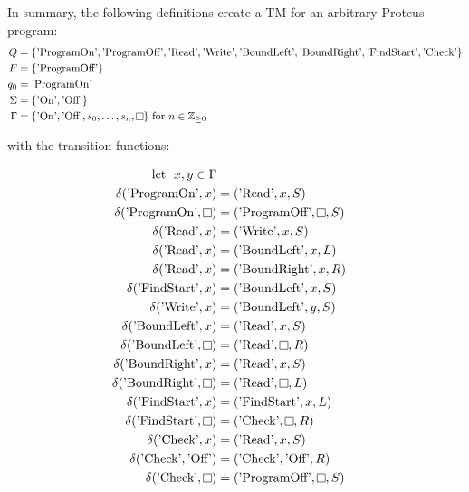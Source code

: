 \newpage

In summary, the following definitions create a TM for an arbitrary Proteus program:
\[
    \begin{aligned}
        Q &= \{\text{'ProgramOn'}, \text{'ProgramOff'}, \text{'Read'}, \text{'Write'}, \text{'BoundLeft'}, \text{'BoundRight'}, \text{'FindStart'}, \text{'Check'}\}\\
        F &= \{\text{'ProgramOff'}\}\\
        q_{0} &= \text{'ProgramOn'}\\
        \Sigma &= \{\text{'On'}, \text{'Off'}\}\\
        \Gamma &= \{\text{'On'}, \text{'Off'}, s_{0}, \dots, s_{n}, \raisebox{0.1cm}{\fbox{}}\} \text{ for } n \in \mathbb{Z}_{\geq \text{0}}
    \end{aligned}
\]

with the transition functions:


\[
    \begin{aligned}
        \text{let \hspace{0.1cm}} x, y \in \Gamma\\
        \delta (\text{'ProgramOn'}, x) &= (\text{'Read'}, x, S)\\
        \delta (\text{'ProgramOn'}, \raisebox{0.1cm}{\fbox{}}) &= (\text{'ProgramOff'}, \raisebox{0.1cm}{\fbox{}}, S)\\
%
        \delta (\text{'Read'}, x) &= (\text{'Write'}, x, S)\\
        \delta (\text{'Read'}, x) &= (\text{'BoundLeft'}, x, L)\\
        \delta (\text{'Read'}, x) &= (\text{'BoundRight'}, x, R)\\
        \delta (\text{'FindStart'}, x) &= (\text{'BoundLeft'}, x, S)\\
%
        \delta (\text{'Write'}, x) &= (\text{'BoundLeft'}, y, S)\\
%
        \delta (\text{'BoundLeft'}, x) &= (\text{'Read'}, x, S)\\
        \delta (\text{'BoundLeft'}, \raisebox{0.1cm}{\fbox{}}) &= (\text{'Read'}, \raisebox{0.1cm}{\fbox{}}, R)\\
%
        \delta (\text{'BoundRight'}, x) &= (\text{'Read'}, x, S)\\
        \delta (\text{'BoundRight'}, \raisebox{0.1cm}{\fbox{}}) &= (\text{'Read'}, \raisebox{0.1cm}{\fbox{}}, L)\\
%
        \delta (\text{'FindStart'}, x) &= (\text{'FindStart'}, x, L)\\
        \delta (\text{'FindStart'}, \raisebox{0.1cm}{\fbox{}}) &= (\text{'Check'}, \raisebox{0.1cm}{\fbox{}}, R)\\
%
        \delta (\text{'Check'}, x) &= (\text{'Read'}, x, S)\\
        \delta (\text{'Check'}, \text{'Off'}) &= (\text{'Check'}, \text{'Off'}, R)\\
        \delta (\text{'Check'}, \raisebox{0.1cm}{\fbox{}}) &= (\text{'ProgramOff'}, \raisebox{0.1cm}{\fbox{}}, S)\\
    \end{aligned}
\]

